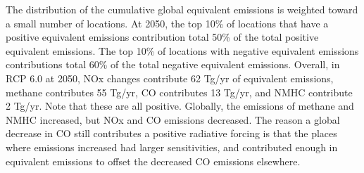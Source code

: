The distribution of the cumulative global equivalent emissions is weighted toward a small number of locations. At 2050, the top 10\% of locations that have a positive equivalent emissions contribution total 50\% of the total positive equivalent emissions. The top 10\% of locations with negative equivalent emissions contributions total 60\% of the total negative equivalent emissions. Overall, in RCP 6.0 at 2050, NOx changes contribute 62 Tg/yr of equivalent emissions, methane contributes 55 Tg/yr, CO contributes 13 Tg/yr, and NMHC contribute 2 Tg/yr. Note that these are all positive. Globally, the emissions of methane and NMHC increased, but NOx and CO emissions decreased. The reason a global decrease in CO still contributes a positive radiative forcing is that the places where emissions increased had larger sensitivities, and contributed enough in equivalent emissions to offset the decreased CO emissions elsewhere.

